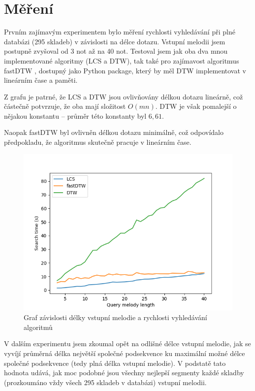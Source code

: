 \section{Měření}

Prvním zajímavým experimentem bylo měření rychlosti vyhledávání při plné databázi (295 skladeb) v závislosti na délce dotazu. Vstupní melodii jsem postupně zvyšoval od 3 not až na 40 not. Testoval jsem jak oba dva mnou implementované algoritmy (LCS a DTW), tak také pro zajímavost algoritmus fastDTW \cite{fastdtw}, dostupný jako Python package, který by měl DTW implementovat v lineárním čase a paměti.

Z grafu je patrné, že LCS a DTW jsou ovlivňovány délkou dotazu lineárně, což částečně potvrzuje, že oba mají složitost $O(mn)$. DTW je však pomalejší o nějakou konstantu -- průměr této konstanty byl ${6,61}$.

Naopak fastDTW byl ovlivněn délkou dotazu minimálně, což odpovídalo předpokladu, že algoritmus skutečně pracuje v lineárním čase.

\begin{figure}[!ht]
    \caption{Graf závislosti délky vstupní melodie a rychlosti vyhledávání algoritmů}
    \centering
    \includegraphics[width=\textwidth]{images/query_len.png}
\end{figure}


V dalším experimentu jsem zkoumal opět na odlišné délce vstupní melodie, jak se vyvíjí průměrná délka největší společné podsekvence ku maximální možné délce společné podsekvence (tedy plná délka vstupní melodie). V podstatě tato hodnota udává, jak moc podobné jsou všechny nejlepší segmenty každé skladby (prozkoumáno vždy všech 295 skladeb v databázi) vstupní melodii.

